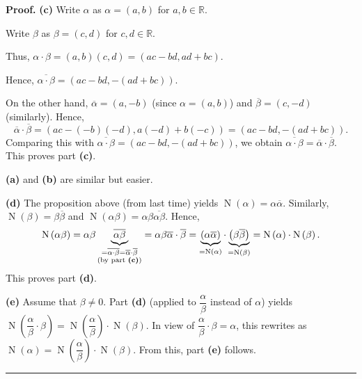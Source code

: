 \documentclass[numbers=enddot,12pt,final,onecolumn,notitlepage]{scrartcl}%
\numberwithin{exer}{subsection}
\theoremstyle{definition}
\newenvironment{proof}[1][Proof]{\noindent\textbf{#1.} }{\ \rule{0.5em}{0.5em}}
\begin{document}
\begin{proof}
\textbf{(c)} Write $\alpha$ as $\alpha=\left(  a,b\right)  $ for
$a,b\in\mathbb{R}$.

Write $\beta$ as $\beta=\left(  c,d\right)  $ for $c,d\in\mathbb{R}$.

Thus, $\alpha\cdot\beta=\left(  a,b\right)  \left(  c,d\right)  =\left(
ac-bd,ad+bc\right)  $.

Hence, $\overline{\alpha\cdot\beta}=\left(  ac-bd,-\left(  ad+bc\right)
\right)  $.

On the other hand, $\overline{\alpha}=\left(  a,-b\right)  $ (since
$\alpha=\left(  a,b\right)  $) and $\overline{\beta}=\left(  c,-d\right)  $
(similarly). Hence,%
\[
\overline{\alpha}\cdot\overline{\beta}=\left(  ac-\left(  -b\right)  \left(
-d\right)  ,a\left(  -d\right)  +b\left(  -c\right)  \right)  =\left(
ac-bd,-\left(  ad+bc\right)  \right)  .
\]
Comparing this with $\overline{\alpha\cdot\beta}=\left(  ac-bd,-\left(
ad+bc\right)  \right)  $, we obtain $\overline{\alpha\cdot\beta}%
=\overline{\alpha}\cdot\overline{\beta}$. This proves part \textbf{(c)}.

\textbf{(a)} and \textbf{(b)} are similar but easier.

\textbf{(d)} The proposition above (from last time) yields $\operatorname*{N}%
\left(  \alpha\right)  =\alpha\overline{\alpha}$. Similarly,
$\operatorname*{N}\left(  \beta\right)  =\beta\overline{\beta}$ and
$\operatorname*{N}\left(  \alpha\beta\right)  =\alpha\beta\overline
{\alpha\beta}$. Hence,%
\[
\operatorname*{N}\left(  \alpha\beta\right)  =\alpha\beta\underbrace{\overline
{\alpha\beta}}_{\substack{=\overline{\alpha\cdot\beta}=\overline{\alpha}%
\cdot\overline{\beta}\\\text{(by part \textbf{(c)})}}}=\alpha\beta
\overline{\alpha}\cdot\overline{\beta}=\underbrace{\left(  \alpha
\overline{\alpha}\right)  }_{=\operatorname*{N}\left(  \alpha\right)  }%
\cdot\underbrace{\left(  \beta\overline{\beta}\right)  }_{=\operatorname*{N}%
\left(  \beta\right)  }=\operatorname*{N}\left(  \alpha\right)  \cdot
\operatorname*{N}\left(  \beta\right)  .
\]
This proves part \textbf{(d)}.

\textbf{(e)} Assume that $\beta\neq0$. Part \textbf{(d)} (applied to
$\dfrac{\alpha}{\beta}$ instead of $\alpha$) yields $\operatorname*{N}\left(
\dfrac{\alpha}{\beta}\cdot\beta\right)  =\operatorname*{N}\left(
\dfrac{\alpha}{\beta}\right)  \cdot\operatorname*{N}\left(  \beta\right)  $.
In view of $\dfrac{\alpha}{\beta}\cdot\beta=\alpha$, this rewrites as
$\operatorname*{N}\left(  \alpha\right)  =\operatorname*{N}\left(
\dfrac{\alpha}{\beta}\right)  \cdot\operatorname*{N}\left(  \beta\right)  $.
From this, part \textbf{(e)} follows.
\end{proof}
\end{document}
